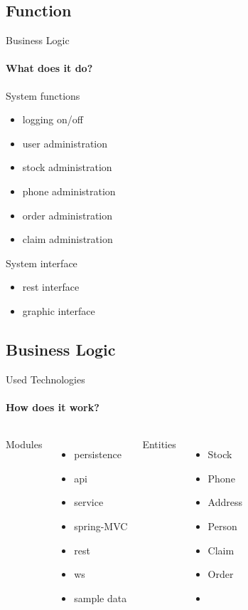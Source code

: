 \documentclass{beamer}
\begin{document}
\begin{darkframes}
	\subsection{Function}
	\begin{frame}{Business Logic}
	\framesubtitle{What does it do?}%
        System functions
        \begin{itemize}
          \item logging on/off
          \item user administration
          \item stock administration
          \item phone administration
          \item order administration
          \item claim administration
        \end{itemize}
        System interface
        \begin{itemize}
          \item rest interface
          \item graphic interface
        \end{itemize}
    \end{frame}    
    
    \subsection{Business Logic}
	\begin{frame}{Used Technologies}
      \framesubtitle{How does it work?}%
      \begin{columns}[onlytextwidth]
      Modules
        \begin{itemize}
          \item persistence
          \item api
          \item service
          \item spring-MVC
          \item rest
          \item ws
          \item sample data
        \end{itemize}
        Entities
          \begin{itemize}
            \item Stock
            \item Phone 
            \item Address
            \item Person
            \item Claim
            \item Order
            \item[] 
          \end{itemize}
      \end{columns}
    \end{frame}  
    

\end{darkframes}
\end{document}
